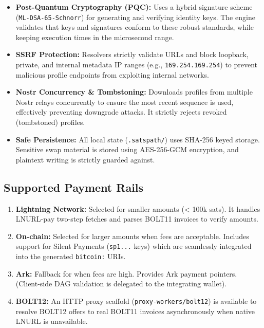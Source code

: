 \documentclass[
]{article}
\providecommand{\tightlist}{%
  \setlength{\itemsep}{0pt}\setlength{\parskip}{0pt}}
\begin{document}
\begin{itemize}
\tightlist
\item
  \textbf{Post-Quantum Cryptography (PQC):} Uses a hybrid signature
  scheme (\texttt{ML-DSA-65-Schnorr}) for generating and verifying
  identity keys. The engine validates that keys and signatures conform
  to these robust standards, while keeping execution times in the
  microsecond range.
\item
  \textbf{SSRF Protection:} Resolvers strictly validate URLs and block
  loopback, private, and internal metadata IP ranges (e.g.,
  \texttt{169.254.169.254}) to prevent malicious profile endpoints from
  exploiting internal networks.
\item
  \textbf{Nostr Concurrency \& Tombstoning:} Downloads profiles from
  multiple Nostr relays concurrently to ensure the most recent sequence
  is used, effectively preventing downgrade attacks. It strictly rejects
  revoked (tombstoned) profiles.
\item
  \textbf{Safe Persistence:} All local state (\texttt{.satspath/}) uses
  SHA-256 keyed storage. Sensitive swap material is stored using
  AES-256-GCM encryption, and plaintext writing is strictly guarded
  against.
\end{itemize}

\hypertarget{supported-payment-rails}{%
\subsection{Supported Payment Rails}\label{supported-payment-rails}}

\begin{enumerate}
\def\labelenumi{\arabic{enumi}.}
\tightlist
\item
  \textbf{Lightning Network:} Selected for smaller amounts (\textless{}
  100k sats). It handles LNURL-pay two-step fetches and parses BOLT11
  invoices to verify amounts.
\item
  \textbf{On-chain:} Selected for larger amounts when fees are
  acceptable. Includes support for Silent Payments (\texttt{sp1...}
  keys) which are seamlessly integrated into the generated
  \texttt{bitcoin:} URIs.
\item
  \textbf{Ark:} Fallback for when fees are high. Provides Ark payment
  pointers. (Client-side DAG validation is delegated to the integrating
  wallet).
\item
  \textbf{BOLT12:} An HTTP proxy scaffold
  (\texttt{proxy-workers/bolt12}) is available to resolve BOLT12 offers
  to real BOLT11 invoices asynchronously when native LNURL is
  unavailable.
\end{enumerate}
\end{document}
